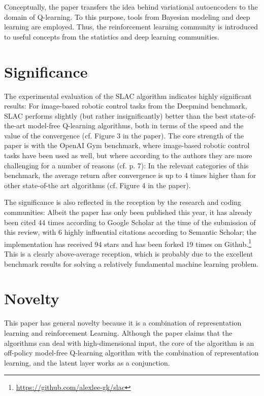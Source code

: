 \documentclass[letterpaper]{article} %
\begin{document}
Conceptually, the paper transfers the idea behind variational autoencoders to the domain of Q-learning. To this purpose, tools from Bayesian modeling and deep learning are employed. Thus, the reinforcement learning community is introduced to useful concepts from the statistics and deep learning communities.

\section{Significance}

The experimental evaluation of the SLAC algorithm indicates highly significant results: For image-based robotic control tasks from the Deepmind benchmark\cite{tassa2018deepmind}, SLAC performs slightly (but rather insignificantly) better than the best state-of-the-art model-free Q-learning algorithms, both in terms of the speed and the value of the convergence (cf. Figure 3 in the paper). The core strength of the paper is with the OpenAI Gym benchmark\cite{brockman2016openai}, where image-based robotic control tasks have been used as well, but where according to the authors they are more challenging for a number of reasons (cf. p. 7): In the relevant categories of this benchmark, the average return after convergence is up to 4 times higher than for other state-of-the art algorithms (cf. Figure 4 in the paper).

The significance is also reflected in the reception by the research and coding communities: Albeit the paper has only been published this year, it has already been cited 44 times according to Google Scholar at the time of the submission of this review, with 6 highly influential citations according to Semantic Scholar; the implementation has received 94 stars and has been forked 19 times on Github.\footnote{\url{https://github.com/alexlee-gk/slac}} This is a clearly above-average reception, which is probably due to the excellent benchmark results for solving a relatively fundamental machine learning problem.

\section{Novelty}

This paper has general novelty because it is a combination of representation learning and reinforcement Learning. Although the paper claims that the algorithms can deal with high-dimensional input, the core of the algorithm is an off-policy model-free Q-learning algorithm with the combination of representation learning, and the latent layer works as a conjunction. 
\end{document}
